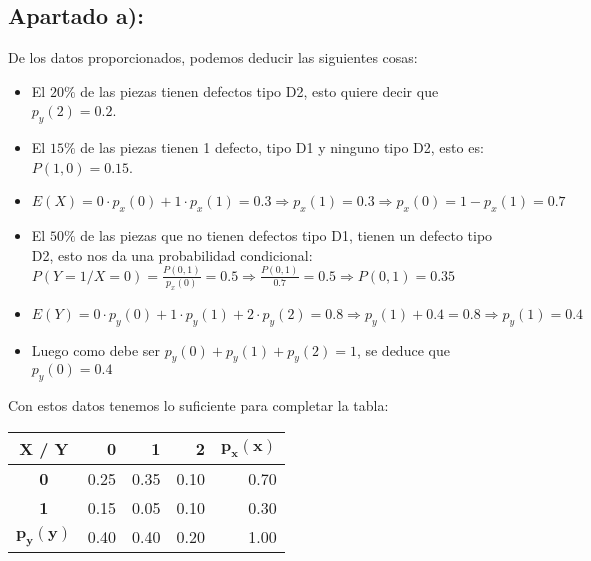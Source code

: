 \documentclass[11pt]{article}
\begin{document}
\subsection*{Apartado a):}

De los datos proporcionados, podemos deducir las siguientes cosas: 

\begin{itemize}

\item El $20\%$ de las piezas tienen defectos tipo D2, esto quiere decir que
      $p_y(2) = 0.2$. 

\item El $15\%$ de las piezas tienen 1 defecto, tipo D1 y ninguno tipo D2, esto es:
      $P(1, 0) = 0.15$. 

\item $ E(X) = 0 \cdot p_x(0) + 1 \cdot p_x(1) = 0.3 \Rightarrow p_x(1) = 0.3 \Rightarrow p_x(0) = 1 - p_x(1) = 0.7$ 

\item El $50\%$ de las piezas que no tienen defectos tipo D1, tienen un defecto
      tipo D2, esto nos da una probabilidad condicional: 
      $P(Y = 1 / X = 0) = \frac{P(0, 1)}{p_x(0)} = 0.5 \Rightarrow \frac{P(0, 1)}{0.7} = 0.5 \Rightarrow P(0, 1)= 0.35 $ 

\item $ E(Y) = 0 \cdot p_y(0) + 1 \cdot p_y(1) + 2 \cdot p_y(2) = 0.8 \Rightarrow p_y(1) + 0.4 = 0.8 \Rightarrow p_y(1) = 0.4 $  

\item Luego como debe ser $p_y(0) + p_y(1) + p_y(2) = 1$, se deduce que $p_y(0) = 0.4$ 

\end{itemize}

Con estos datos tenemos lo suficiente para completar la tabla:

\begin{center}
    \begin{tabular}{| c | r | r | r | r |}
    \hline
    \textbf{X / Y} & \textbf{0} & \textbf{1} & \textbf{2} & $\mathbf{p_x(x)}$ \\ \hline
    \textbf{0} & 0.25 & 0.35 & 0.10 & 0.70 \\ \hline
    \textbf{1} & 0.15 & 0.05 & 0.10 & 0.30 \\ \hline
    $\mathbf{p_y(y)}$ & 0.40 & 0.40 & 0.20 & 1.00 \\ \hline
    \end{tabular}
\end{center}
\end{document}
